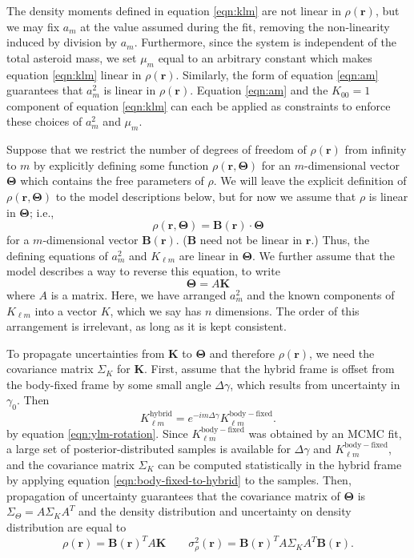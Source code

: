 \documentclass[fleqn,usenatbib]{mnras}
\begin{document}
The density moments defined in equation \ref{eqn:klm} are not linear in $\rho(\bm r)$, but we may fix $a_m$ at the value assumed during the fit, removing the non-linearity induced by division by $a_m$. Furthermore, since the system is independent of the total asteroid mass, we set $\mu_m$ equal to an arbitrary constant which makes equation \ref{eqn:klm} linear in $\rho(\bm r)$. Similarly, the form of equation \ref{eqn:am} guarantees that $a_m^2$ is linear in $\rho(\bm r)$. Equation \ref{eqn:am} and the $K_{00}=1$ component of equation \ref{eqn:klm} can each be applied as constraints to enforce these choices of $a_m^2$ and $\mu_m$.

Suppose that we restrict the number of degrees of freedom of $\rho(\bm r)$ from infinity to $m$ by explicitly defining some function $\rho(\bm r, \bm \Theta)$ for an $m$-dimensional vector $\bm \Theta$ which contains the free parameters of $\rho$. We will leave the explicit definition of $\rho(\bm r, \bm \Theta)$ to the model descriptions below, but for now we assume that $\rho$ is linear in $\bm \Theta$; i.e.,
\begin{equation}
  \rho(\bm r, \bm \Theta) = \bm B(\bm r) \cdot \bm \Theta
  \label{eqn:density-distro}
\end{equation}
for a $m$-dimensional vector $\bm B(\bm r)$. ($\bm B$ need not be linear in $\bm r$.) Thus, the defining equations of $a_m^2$ and $K_{\ell m}$ are linear in $\bm \Theta$. We further assume that the model describes a way to reverse this equation, to write
\begin{equation}
  \bm \Theta = A \bm K
  \label{eqn:density-model}
\end{equation}
where $A$ is a matrix. Here, we have arranged $a_m^2$ and the known components of $K_{\ell m}$ into a vector $K$, which we say has $n$ dimensions. The order of this arrangement is irrelevant, as long as it is kept consistent.

To propagate uncertainties from $\bm K$ to $\bm \Theta$ and therefore $\rho(\bm r)$, we need the covariance matrix $\Sigma_K$ for $\bm K$. First, assume that the hybrid frame is offset from the body-fixed frame by some small angle $\Delta \gamma$, which results from uncertainty in $\gamma_0$. Then
\begin{equation}
  K_{\ell m}^\mathrm{hybrid} = e^{-im\Delta \gamma}K_{\ell m}^\mathrm{body-fixed}.
  \label{eqn:body-fixed-to-hybrid}
\end{equation}
by equation \ref{eqn:ylm-rotation}. Since $K_{\ell m}^\mathrm{body-fixed}$ was obtained by an MCMC fit, a large set of posterior-distributed samples is available for $\Delta \gamma$ and $K_{\ell m}^\mathrm{body-fixed}$, and the covariance matrix $\Sigma_K$ can be computed statistically in the hybrid frame by applying equation \ref{eqn:body-fixed-to-hybrid} to the samples. Then, propagation of uncertainty guarantees that the covariance matrix of $\bm \Theta$ is $\Sigma_\Theta = A \Sigma_K A^T$ and the density distribution and uncertainty on density distribution are equal to
\begin{equation}
  \rho(\bm r) = \bm B(\bm r)^T A\bm K \qquad \sigma^2_\rho(\bm r) = \bm B(\bm r)^T A \Sigma_K A^T \bm B(\bm r).
  \label{eqn:unc-rho}
\end{equation}
\end{document}
